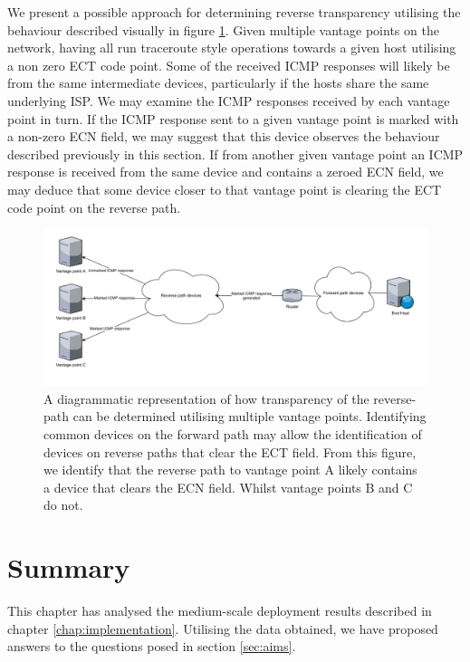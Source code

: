 \documentclass{l4proj}
\begin{document}
We present a possible approach for determining reverse transparency utilising the behaviour described visually in figure \ref{fig:reverse}. Given multiple vantage points on the network, having all run traceroute style operations towards a given host utilising a non zero ECT code point. Some of the received ICMP responses will likely be from the same intermediate devices, particularly if the hosts share the same underlying ISP. We may examine the ICMP responses received by each vantage point in turn. If the ICMP response sent to a given vantage point is marked with a non-zero ECN field, we may suggest that this device observes the behaviour described previously in this section. If from another given vantage point an ICMP response is received from the same device and contains a zeroed ECN field, we may deduce that some device closer to that vantage point is clearing the ECT code point on the reverse path.

\begin{figure}[H]
    \centering
    \includegraphics[scale=0.5]{dissertation/images/reversepath.pdf}
    \caption{A diagrammatic representation of how transparency of the reverse-path can be determined utilising multiple vantage points. Identifying common devices on the forward path may allow the identification of devices on reverse paths that clear the ECT field. From this figure, we identify that the reverse path to vantage point A likely contains a device that clears the ECN field. Whilst vantage points B and C do not.}
    \label{fig:reverse}
\end{figure}

\section{Summary}

This chapter has analysed the medium-scale deployment results described in chapter \ref{chap:implementation}. Utilising the data obtained, we have proposed answers to the questions posed in section \ref{sec:aims}.
\end{document}
